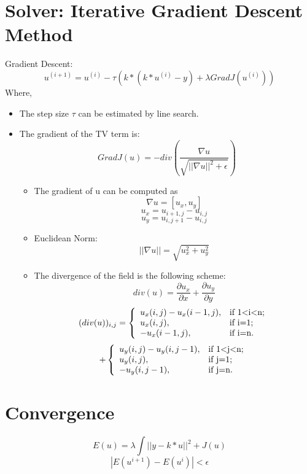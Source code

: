 \documentclass[paper=a4, fontsize=11pt]{scrartcl}
\begin{document}
\section{Solver: Iterative Gradient Descent Method}
Gradient Descent:
\begin{equation}
u^{(i+1)}= u^{(i)}-\tau \left(k \ast (k \ast u^{(i)}-y)+\lambda Grad J(u^{(i)})\right)
\end{equation}
Where,
\begin{itemize}
  \item The step size $\tau$ can be estimated by line search.
  \item The gradient of the TV term is:
\begin{equation}
Grad J(u)=-div \left(\frac{\nabla u}{\sqrt{||\nabla u||^2+\epsilon}}\right)
\end{equation}
\begin{itemize}
  \item The gradient of u can be computed as
\begin{equation}
\nabla u = [u_x, u_y]
\end{equation}
\begin{equation*}
u_x=u_{i+1,j}-u_{i,j}
\end{equation*}
\begin{equation*}
u_y=u_{i,j+1}-u_{i,j}
\end{equation*}
  \item Euclidean Norm:
\begin{equation}
||\nabla u ||=\sqrt{u_x^2+u_y^2}
\end{equation}
  \item The divergence of the field is the following scheme:
\begin{equation}
div(u)=\frac{\partial u_x}{\partial x}+\frac{\partial u_y}{\partial y}
\end{equation}
\begin{equation*}
(div(u))_{i,j}=
\left\{
  \begin{array}{ll}
    u_x(i,j)-u_x(i-1,j), & \hbox{if 1$<$i$<$n;} \\
    u_x(i,j), & \hbox{if i=1;} \\
    -u_x(i-1,j), & \hbox{if i=n.}
  \end{array}
\right.
\end{equation*}
\begin{equation*}
+
\left\{
  \begin{array}{ll}
    u_y(i,j)-u_y(i,j-1), & \hbox{if 1$<$j$<$n;} \\
    u_y(i,j), & \hbox{if j=1;} \\
    -u_y(i,j-1), & \hbox{if j=n.}
  \end{array}
\right.
\end{equation*}
\end{itemize}
\end{itemize}

\section{Convergence}
\begin{equation}
E(u) = \lambda \int ||y-k*u||^2 + J(u)
\end{equation}
\begin{equation}
|E(u^{i+1})-E(u^{i})| < \epsilon
\end{equation}
\end{document}

